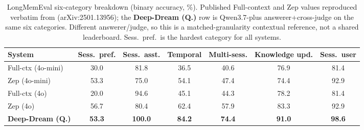 \begin{table}[t]
\centering
\caption{LongMemEval six-category breakdown (binary accuracy, \%). Published Full-context and Zep values reproduced verbatim from \citet{rasmussen2025zep} (arXiv:2501.13956); the \textbf{Deep-Dream (Q.)} row is Qwen3.7-plus answerer+cross-judge on the same six categories. Different answerer/judge, so this is a matched-granularity contextual reference, not a shared leaderboard. Sess.\ pref.\ is the hardest category for all systems.}
\label{tab:zep-longmemeval-cat}
\footnotesize
\setlength{\tabcolsep}{3.5pt}
\begin{tabular}{lcccccc}
\toprule
System & Sess.\ pref. & Sess.\ asst. & Temporal & Multi-sess. & Knowledge upd. & Sess.\ user \\
\midrule
Full-ctx (4o-mini) & 30.0 & 81.8 & 36.5 & 40.6 & 76.9 & 81.4 \\
Zep (4o-mini) & 53.3 & 75.0 & 54.1 & 47.4 & 74.4 & 92.9 \\
Full-ctx (4o) & 20.0 & 94.6 & 45.1 & 44.3 & 78.2 & 81.4 \\
Zep (4o) & 56.7 & 80.4 & 62.4 & 57.9 & 83.3 & 92.9 \\
\textbf{Deep-Dream (Q.)} & \textbf{53.3} & \textbf{100.0} & \textbf{84.2} & \textbf{74.4} & \textbf{91.0} & \textbf{98.6} \\
\bottomrule
\end{tabular}
\end{table}
